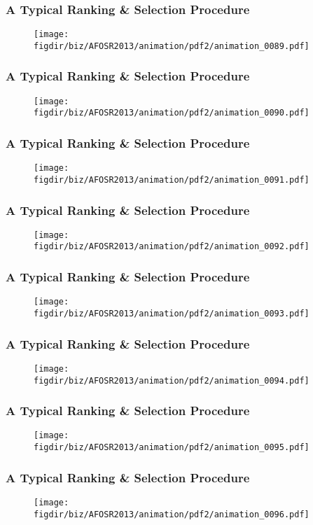 \documentclass[13pt]{beamer}
\newcommand{\figdir}{../../fig}
\begin{document}
{\begin{frame}\frametitle{A Typical Ranking \& Selection Procedure}\begin{figure}\texttt{[image: \\figdir/biz/AFOSR2013/animation/pdf2/animation\_0089.pdf]}\end{figure}\end{frame}
\begin{frame}\frametitle{A Typical Ranking \& Selection Procedure}\begin{figure}\texttt{[image: \\figdir/biz/AFOSR2013/animation/pdf2/animation\_0090.pdf]}\end{figure}\end{frame}
\begin{frame}\frametitle{A Typical Ranking \& Selection Procedure}\begin{figure}\texttt{[image: \\figdir/biz/AFOSR2013/animation/pdf2/animation\_0091.pdf]}\end{figure}\end{frame}
\begin{frame}\frametitle{A Typical Ranking \& Selection Procedure}\begin{figure}\texttt{[image: \\figdir/biz/AFOSR2013/animation/pdf2/animation\_0092.pdf]}\end{figure}\end{frame}
\begin{frame}\frametitle{A Typical Ranking \& Selection Procedure}\begin{figure}\texttt{[image: \\figdir/biz/AFOSR2013/animation/pdf2/animation\_0093.pdf]}\end{figure}\end{frame}
\begin{frame}\frametitle{A Typical Ranking \& Selection Procedure}\begin{figure}\texttt{[image: \\figdir/biz/AFOSR2013/animation/pdf2/animation\_0094.pdf]}\end{figure}\end{frame}
\begin{frame}\frametitle{A Typical Ranking \& Selection Procedure}\begin{figure}\texttt{[image: \\figdir/biz/AFOSR2013/animation/pdf2/animation\_0095.pdf]}\end{figure}\end{frame}
\begin{frame}\frametitle{A Typical Ranking \& Selection Procedure}\begin{figure}\texttt{[image: \\figdir/biz/AFOSR2013/animation/pdf2/animation\_0096.pdf]}\end{figure}\end{frame}
}
\end{document}
